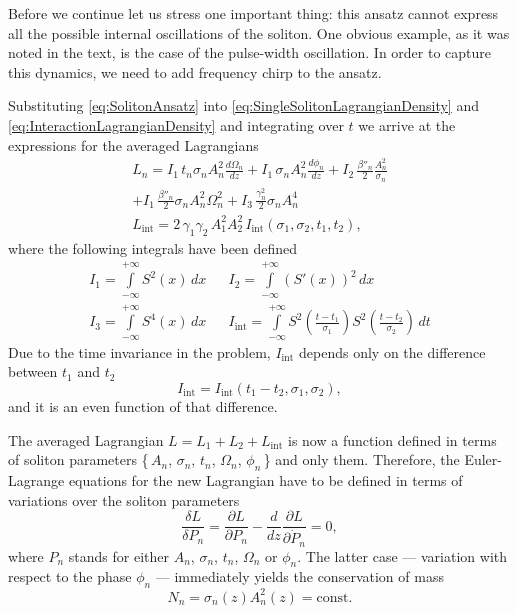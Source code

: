 \documentclass[aps, pra, signlecolumn, superscriptaddress, final, 11pt]{revtex4}
\begin{document}
Before we continue let us stress one important thing: this ansatz cannot express all the possible internal oscillations of the soliton. One obvious example, as it was noted in the text, is the case of the pulse-width oscillation. In order to capture this dynamics, we need to add frequency chirp to the ansatz.

Substituting \eqref{eq:SolitonAnsatz} into \eqref{eq:SingleSolitonLagrangianDensity} and \eqref{eq:InteractionLagrangianDensity} and integrating over $t$ we arrive at the expressions for the averaged Lagrangians
\begin{gather}
  L_{n} =
    I_{1} \, t_{n} \sigma_{n} A_{n}^{2} \frac{d \Omega_{n}}{d z} +
    I_{1} \, \sigma_{n} A_{n}^{2} \frac{d \phi_{n}}{d z} +
    I_{2} \, \frac{\beta''_{n}}{2} \frac{A_{n}^{2}}{\sigma_{n}} \nonumber \\
    + I_{1} \, \frac{\beta''_{n}}{2} \sigma_{n} A_{n}^{2} \Omega_{n}^{2} +
    I_{3} \, \frac{\gamma_{n}^{2}}{2} \sigma_{n} A_{n}^{4} \\
  L_{\text{int}} =
    2 \, \gamma_{1} \gamma_{2} \, A_{1}^{2} A_{2}^{2} \,
    I_{\text{int}}(\sigma_{1}, \sigma_{2}, t_{1}, t_{2}),
\end{gather}
where the following integrals have been defined
\begin{align*}
  I_{1} =
    \int \limits_{-\infty}^{+\infty}
    S^{2}(x) \, dx &&
  I_{2} =
    \int \limits_{-\infty}^{+\infty}
    (S'(x))^{2} \, dx \\
  I_{3} =
    \int \limits_{-\infty}^{+\infty}
    S^{4}(x) \, dx &&
  I_{\text{int}} =
    \int \limits_{-\infty}^{+\infty}
    S^{2}\left(
      \frac{t - t_{1}}{\sigma_{1}}
    \right)
    S^{2}\left(
      \frac{t - t_{2}}{\sigma_{2}}
    \right) \, dt
\end{align*}
Due to the time invariance in the problem, $I_{\text{int}}$ depends only on the difference between $t_{1}$ and $t_{2}$
\begin{equation*}
  I_{\text{int}} = I_{\text{int}}(t_{1} - t_{2}, \sigma_{1}, \sigma_{2}),
\end{equation*}
and it is an even function of that difference.

The averaged Lagrangian $L = L_{1} + L_{2} + L_{\text{int}}$ is now a function defined in terms of soliton parameters \{\,$A_{n}$, $\sigma_{n}$, $t_{n}$, $\Omega_{n}$, $\phi_{n}$\,\} and only them. Therefore, the Euler-Lagrange equations for the new Lagrangian have to be defined in terms of variations over the soliton parameters
\begin{equation*}
  \frac{\delta L}{\delta P_{n}} =
    \frac{\partial{L}}{{\partial P_{n}}} -
    \frac{d}{dz} \frac{\partial L}{\partial \dot P_{n}} = 0,
\end{equation*}
where $P_{n}$ stands for either $A_{n}$, $\sigma_{n}$, $t_{n}$, $\Omega_{n}$ or $\phi_{n}$. The latter case --- variation with respect to the phase $\phi_{n}$ --- immediately yields the conservation of mass
\begin{equation}
  \label{eq:ConservationOfMass}
  N_{n} = \sigma_{n}(z) A_{n}^{2}(z) = \mathrm{const.}
\end{equation}
\end{document}
